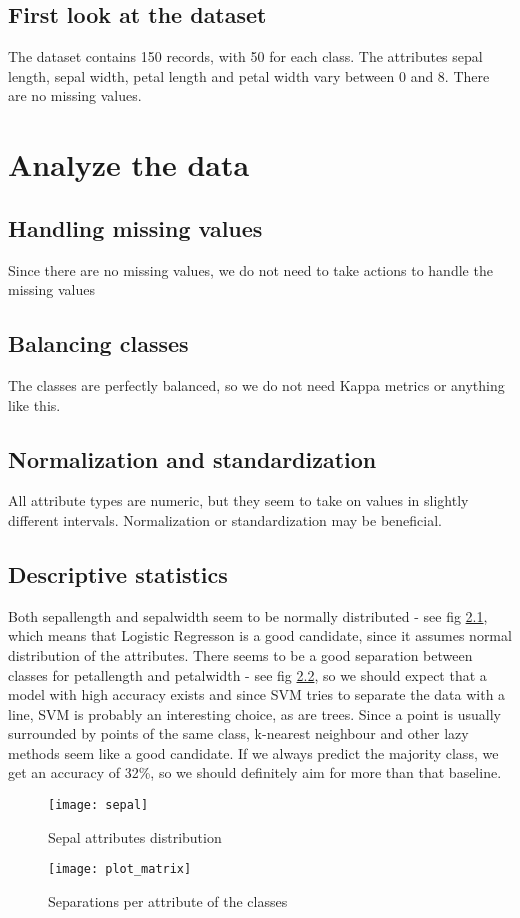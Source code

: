 \section{First look at the dataset}
The dataset contains 150 records, with 50 for each class. The attributes sepal length, sepal width, petal length and petal width vary between 0 and 8. There are no missing values.

\chapter{Analyze the data}
\section{Handling missing values}
Since there are no missing values, we do not need to take actions to handle the missing values
\section{Balancing classes}
The classes are perfectly balanced, so we do not need Kappa metrics or anything like this.
\section{Normalization and standardization}
All attribute types are numeric, but they seem to take on values in slightly different intervals. Normalization or standardization may be beneficial.
\section{Descriptive statistics}
Both sepallength and sepalwidth seem to be normally distributed - see fig \ref{fig:sepal}, which means that Logistic Regresson is a good candidate, since it assumes normal distribution of the attributes. There seems to be a good separation between classes for petallength and petalwidth - see fig \ref{fig:plot_matrix}, so we should expect that a model with high accuracy exists and since SVM tries to separate the data with a line, SVM is probably an interesting choice, as are trees. Since a point is usually surrounded by points of the same class, k-nearest neighbour and other lazy methods seem like a good candidate. If we always predict the majority class, we get an accuracy of 32\%, so we should definitely aim for more than that baseline.
\begin{figure}
    \centering
    \texttt{[image: sepal]}
    \caption{Sepal attributes distribution}
    \label{fig:sepal}
\end{figure}
\begin{figure}
    \centering
    \texttt{[image: plot\_matrix]}
    \caption{Separations per attribute of the classes}
    \label{fig:plot_matrix}
\end{figure}


